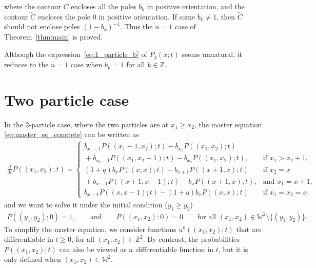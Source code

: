 \documentclass[11pt]{article}
\numberwithin{equation}{section}
\newcommand{\intZ}{\mathbb{Z}}
\newcommand{\Weylchamber}{\mathbb{W}}
\begin{document}
where the contour $C$ encloses all the poles $b_k$ in positive orientation, and the contour $\tilde{C}$ encloses the pole $0$ in positive orientation. If some $b_k \neq 1$, then $\tilde{C}$ should not enclose poles $(1 - b_k)^{-1}$. Thus the $n = 1$ case of Theorem~\ref{thm:main} is proved.

\begin{Remark}
 Although the expression~\eqref{eq:1_particle_b} of $P_y(x; t)$ seems unnatural, it reduces to the $n = 1$ case \cite[Theorem~2.1]{Korhonen-Lee14} when $b_k = 1$ for all $k \in \intZ$.
\end{Remark}

\section{Two particle case} \label{sec:2_particle_case}

In the $2$-particle case, where the two particles are at $x_1 \geq x_2$, the master equation \eqref{eq:master_eq_concrete} can be written as
\begin{gather} \label{eq:master_eq_2_particles}
 \frac{d}{dt} P((x_1, x_2); t) =
 \begin{cases}
 b_{x_1 - 1} P((x_1 - 1, x_2); t) - b_{x_1} P((x_1, x_2); t) & \\
{} + b_{x_2 - 1} P((x_1, x_2 - 1); t) - b_{x_2} P((x_1, x_2); t),
 & \text{if $x_1 > x_2 + 1$}, \\
 (1 + q) b_xP((x, x); t) - b_{x + 1} P((x + 1, x); t) & \text{if $x_2 = x$} \\
{} + b_{x - 1} P((x + 1, x - 1); t) - b_x P((x + 1, x); t),
& \text{and $x_1 = x + 1$}, \\
 b_{x - 1} P((x, x - 1); t) - (1 + q) b_x P((x, x); t) & \text{if $x_1 = x_2 = x$}.
 \end{cases}\!\!\!\!
\end{gather}
and we want to solve it under the initial condition ($y_1 \geq y_2$)
\begin{gather} \label{eq:init_C_2_particles}
 P((y_1, y_2); 0) = 1, \qquad \text{and} \qquad P((x_1, x_2); 0) = 0 \qquad \text{for all $(x_1, x_2) \in \Weylchamber^2 {\setminus} \{ (y_1, y_2) \}$}.\!\!\!
\end{gather}
To simplify the master equation, we consider functions $u^0((x_1, x_2); t)$ that are dif\/ferentiable in $t \geq 0$, for all $(x_1, x_2) \in \intZ^2$. By contrast, the probabilities $P((x_1, x_2); t)$ can also be viewed as a~dif\/ferentiable function in $t$, but it is only def\/ined when $(x_1, x_2) \in \Weylchamber^2$.
\end{document}
